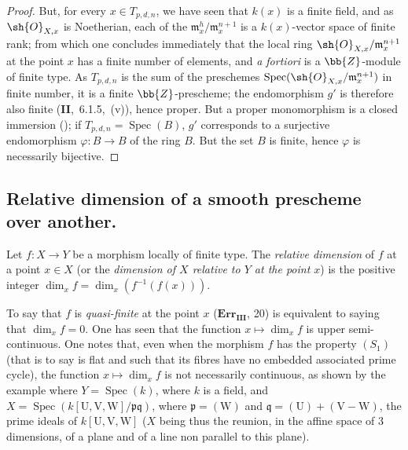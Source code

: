 \begin{proof}
But, for every $x\in T_{p,d,n}$, we have seen that $k(x)$ is a finite field, and as $\sh{O}_{X,x}$ is Noetherian, each of the $\mathfrak{m}_x^h/\mathfrak{m}_x^{n+1}$ is a $k(x)$-vector space of finite rank; from which one concludes immediately that the local ring $\sh{O}_{X,x}/\mathfrak{m}_x^{n+1}$ at the point $x$ has a finite number of elements, and \emph{a fortiori} is a $\bb{Z}$-module of finite type.
As $T_{p,d,n}$ is the sum of the preschemes $\operatorname{Spec}(\sh{O}_{X,x}/\mathfrak{m}_x^{n+1})$ in finite number, it is a finite $\bb{Z}$-prescheme; the endomorphism $g'$ is therefore also finite (\textbf{II},~6.1.5,~(v)), hence proper.
But a proper monomorphism is a closed immersion (); if $T_{p,d,n}=\operatorname{Spec}(B)$, $g'$ corresponds to a surjective endomorphism $\varphi:B\to B$ of the ring $B$.
But the set $B$ is finite, hence $\varphi$ is necessarily bijective.
\end{proof}


\subsection{Relative dimension of a smooth prescheme over another.}
\label{subsection:IV.17.10}


\begin{definition}[17.10.1]
\label{IV.17.10.1}
Let $f:X\to Y$ be a morphism locally of finite type.
The \emph{relative dimension} of $f$ at a point $x\in X$ (or the \emph{dimension of $X$ relative to $Y$ at the point $x$}) is the positive integer $\dim_x f=\dim_x(f^{-1}(f(x)))$.
\end{definition}

To say that $f$ is \emph{quasi-finite} at the point $x$ ($\mathbf{Err_{III}}$, 20) is equivalent to saying that $\dim_x f=0$.
One has seen  that the function $x\mapsto\dim_x f$ is upper semi-continuous.
One notes that, even when the morphism $f$ has the property $(S_1)$ (that is to say  is flat and such that its fibres have no embedded associated prime cycle), the function $x\mapsto\dim_x f$ is not necessarily continuous, as shown by the example where $Y=\operatorname{Spec}(k)$, where $k$ is a field, and $X=\operatorname{Spec}(k[\mathrm{U},\mathrm{V},\mathrm{W}]/\mathfrak{p}\mathfrak{q})$, where $\mathfrak{p}=(\mathrm{W})$ and $\mathfrak{q}=(\mathrm{U})+(\mathrm{V}-\mathrm{W})$, the prime ideals of $k[\mathrm{U},\mathrm{V},\mathrm{W}]$ ($X$ being thus the reunion, in the affine space of $3$ dimensions, of a plane and of a line non parallel to this plane).

